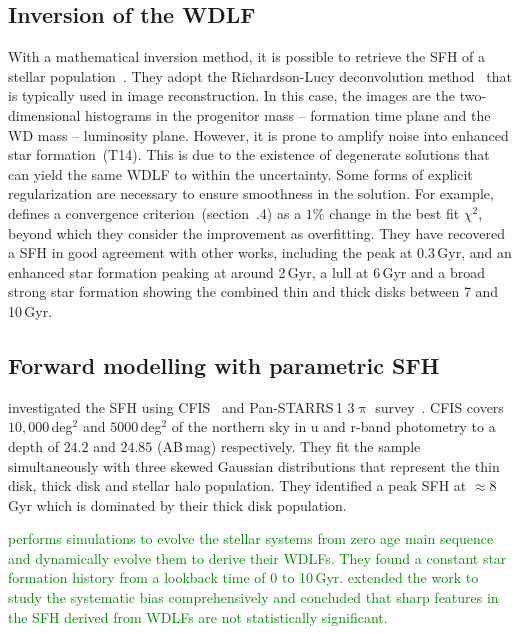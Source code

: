 \documentclass[fleqn,usenatbib]{mnras}
\begin{document}
\subsection{Inversion of the WDLF}
With a mathematical inversion method, it is possible to retrieve the SFH of a
stellar population~\citep{2013MNRAS.434.1549R}. They adopt the Richardson-Lucy 
deconvolution method~\citep{1972JOSA...62...55R, 1974AJ.....79..745L} that is 
typically used in image reconstruction. In this case, the images are the
two-dimensional histograms in the progenitor mass -- formation time plane and
the WD mass -- luminosity plane. However, it is prone to amplify noise into
enhanced star formation~(T14). This is due to the existence of degenerate
solutions that can yield the same WDLF to within the uncertainty. Some forms
of explicit regularization are necessary to ensure smoothness in the solution.
For example, \citet{2013MNRAS.434.1549R} defines a convergence
criterion~(section~.4) as a $1\%$ change in the best fit
$\chi^2$, beyond which they consider the improvement as overfitting. They have 
recovered a SFH in good agreement with other works, including the peak at
0.3\,Gyr, and an enhanced star formation peaking at around 2\,Gyr, a lull at
6\,Gyr and a broad strong star formation showing the combined thin and thick
disks between 7 and 10\,Gyr.

\subsection{Forward modelling with parametric SFH}
\citet{2019ApJ...887..148F} investigated the SFH using
CFIS~\citep{2017ApJ...848..128I} and Pan-STARRS\,1 3$\uppi$
survey~\citep{2016arXiv161205560C}. CFIS covers $10,000$\,deg$^2$ and
$5000$\,deg$^2$ of the northern sky in u and r-band photometry to a depth of
$24.2$ and $24.85$ (AB\,mag) respectively. They fit the sample simultaneously
with three skewed Gaussian distributions that represent the thin disk, thick
disk and stellar halo population. They identified a peak SFH at $\approx8$\,Gyr
which is dominated by their thick disk population.

\textcolor{green}{\citet[][hereafter, C23]{2023MNRAS.522.1643C} performs simulations
to evolve the stellar systems from zero age main sequence and dynamically evolve
them to derive their WDLFs. They found a constant star formation history from a
lookback time of 0 to 10\,Gyr. \citet[][hereafter, R25]{2025MNRAS.538.2548R}
extended the work to study the systematic bias comprehensively and concluded that
sharp features in the SFH derived from WDLFs are not statistically significant.
}
\end{document}

